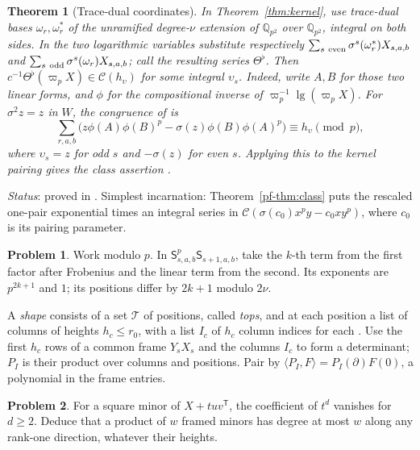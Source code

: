 \documentclass[reqno]{amsart}
\theoremstyle{definition}
\newtheorem{problem}{Problem}[section]
\theoremstyle{plain}
\newtheorem{theorem}{Theorem}[section]
\newcommand{\Q}{\mathbb Q}
\begin{document}
\begin{theorem}[Trace-dual coordinates]\label{thm:class}
In Theorem~\ref{thm:kernel}, use trace-dual bases \(\omega_r,\omega_r^*\) of the unramified degree-\(\nu\) extension of \(\Q_{p^2}\) over \(\Q_{p^2}\), integral on both sides. In the two logarithmic variables substitute respectively
\(\sum_{s\ {\rm even}}\sigma^s(\omega_r^*)X_{s,a,b}\) and
\(\sum_{s\ {\rm odd}}\sigma^s(\omega_r)X_{s,a,b}\); call the resulting series \(\Theta^\flat\).
Then \(c^{-1}\Theta^\flat(\varpi_p X)\in\mathcal C(h_\upsilon)\) for some integral \(\upsilon_s\). Indeed, write \(A,B\) for those two linear forms, and \(\phi\) for the compositional inverse of \(\varpi_p^{-1}\operatorname{lg}(\varpi_p X)\). For \(\sigma^2 z=z\) in \(W\), the congruence of \cite[Thm.~9.4]{Adr} is
\[
 \sum_{r,a,b}\big(z\phi(A)\phi(B)^p-\sigma(z)\phi(B)\phi(A)^p\big)
 \equiv h_\upsilon\pmod p ,
\]
where \(\upsilon_s=z\) for odd \(s\) and \(-\sigma(z)\) for even \(s\). Applying this to the kernel pairing gives the class assertion \cite[Prop.~9.5, Cor.~8.22]{Adr}.
\end{theorem}
\noindent \emph{Status}: proved in \cite{Adr}. Simplest incarnation: Theorem~\ref{pf-thm:class} puts the rescaled one-pair exponential times an integral series in \(\mathcal C(\sigma(c_0)x^py-c_0xy^p)\), where \(c_0\) is its pairing parameter.

\begin{problem}\label{pr:odd}
Work modulo \(p\). In \(\mathsf S_{s,a,b}^p\mathsf S_{s+1,a,b}\), take the \(k\)-th term from the first factor after Frobenius and the linear term from the second. Its exponents are \(p^{2k+1}\) and \(1\); its positions differ by \(2k+1\) modulo \(2\nu\).
\end{problem}

A \emph{shape} consists of a set \(\mathcal T\) of positions, called \emph{tops}, and at each position a list of columns of heights \(h_c\le r_0\), with a list \(I_c\) of \(h_c\) column indices for each \cite[\S9]{Adr}. Use the first \(h_c\) rows of a common frame \(Y_sX_s\) and the columns \(I_c\) to form a determinant; \(P_I\) is their product over columns and positions. Pair by \(\langle P_I,F\rangle=P_I(\partial)F(0)\), a polynomial in the frame entries.

\begin{problem}\label{pr:cap}
For a square minor of \(X+tuv^{\mathsf T}\), the coefficient of \(t^d\) vanishes for \(d\ge2\). Deduce that a product of \(w\) framed minors has degree at most \(w\) along any rank-one direction, whatever their heights.
\end{problem}
\end{document}
